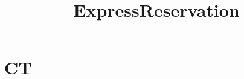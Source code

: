 \documentclass{article}
\begin{document}
\title{ExpressReservation}
\author{}
\maketitle
\tableofcontents

\section{CT}

\end{document}
